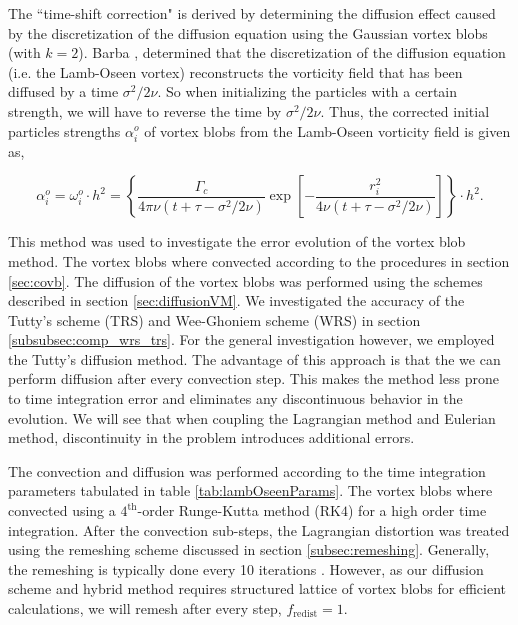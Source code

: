 The ``time-shift correction" is derived by determining the diffusion effect caused by the discretization of the diffusion equation using the Gaussian vortex blobs (with $k=2$). Barba \cite{Barba2004c}, determined that the discretization of the diffusion equation (i.e. the Lamb-Oseen vortex) reconstructs the vorticity field that has been diffused by a time $\sigma^2/2\nu$. So when initializing the particles with a certain strength, we will have to reverse the time by $\sigma^2/2\nu$. Thus, the corrected initial particles strengths $\alpha_i^o$ of vortex blobs from the Lamb-Oseen vorticity field is given as,

	\begin{equation}
	\alpha_i^o = \omega_i^o\cdot h^2 = \left\{ \frac{\Gamma_c}{4\pi\nu\left(t+\tau-\sigma^2/2\nu\right)} \exp\left[-\frac{r_i^2}{4\nu\left(t+\tau-\sigma^2/2\nu\right)}\right] \right\} \cdot h^2.
	\label{eq:lo_pie}
	\end{equation}
	
This method was used to investigate the error evolution of the vortex blob method. The vortex blobs where convected according to the procedures in section \ref{sec:covb}. The diffusion of the vortex blobs was performed using the schemes described in section \ref{sec:diffusionVM}. We investigated the accuracy of the Tutty's scheme (TRS) and Wee-Ghoniem scheme (WRS) in section \ref{subsubsec:comp_wrs_trs}. For the general investigation however, we employed the Tutty's diffusion method. The advantage of this approach is that the we can perform diffusion after every convection step. This makes the method less prone to time integration error and eliminates any discontinuous behavior in the evolution. We will see that when coupling the Lagrangian method and Eulerian method, discontinuity in the problem introduces additional errors.

%	
	


The convection and diffusion was performed according to the time integration parameters tabulated in table \ref{tab:lambOseenParams}. The vortex blobs where convected using a $4^{\mathrm{th}}$-order Runge-Kutta method ($\mathrm{RK4}$) for a high order time integration. After the convection sub-steps, the Lagrangian distortion was treated using the remeshing scheme discussed in section \ref{subsec:remeshing}. Generally, the remeshing is typically done every 10 iterations \cite{Barba2004c}. However, as our diffusion scheme and hybrid method requires structured lattice of vortex blobs for efficient calculations, we will remesh after every step, $f_{\mathrm{redist}}=1$.  


